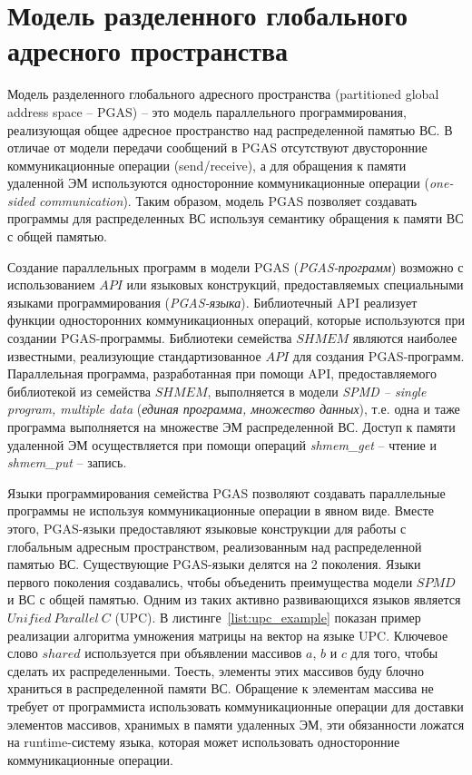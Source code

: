 \chapter{Модель разделенного глобального адресного пространства} \label{chapt4}

Модель разделенного глобального адресного пространства (partitioned global address space -- PGAS) -- это модель параллельного программирования, реализующая общее адресное пространство над распределенной памятью ВС. В отличае от модели передачи сообщений в PGAS отсутствуют двусторонние коммуникационные операции (send/receive), а для обращения к памяти удаленной ЭМ используются односторонние коммуникационные операции (\textit{one-sided communication}). Таким образом, модель PGAS позволяет создавать программы для распределенных ВС используя семантику обращения к памяти ВС с общей памятью.

Создание параллельных программ в модели PGAS (\textit{PGAS-программ}) возможно с использованием $API$ или языковых конструкций, предоставляемых специальными языками программирования (\textit{PGAS-языка}). Библиотечный API реализует функции односторонних коммуникационных операций, которые используются при создании PGAS-программы. Библиотеки семейства $SHMEM$ являются наиболее известными, реализующие стандартизованное $API$ для создания PGAS-программ. Параллельная программа, разработанная при помощи API, предоставляемого библиотекой из семейства $SHMEM$, выполняется в модели \textit{SPMD -- single program, multiple data} (\textit{единая программа, множество данных}), т.е. одна и таже программа выполняется на множестве ЭМ распределенной ВС. Доступ к памяти удаленной ЭМ осуществляется при помощи операций \textit{shmem\_get} -- чтение и \textit{shmem\_put} -- запись.

Языки программирования семейства PGAS позволяют создавать параллельные программы не используя коммуникационные операции в явном виде. Вместе этого, PGAS-языки предоставляют языковые конструкции для работы с глобальным адресным пространством, реализованным над распределенной памятью ВС. Существующие PGAS-языки делятся на 2 поколения. Языки первого поколения создавались, чтобы объеденить преимущества модели $SPMD$ и ВС с общей памятью. Одним из таких активно развивающихся языков является $Unified\ Parallel\ C$ (UPC). В листинге~\ref{list:upc_example} показан пример реализации алгоритма умножения матрицы на вектор на языке UPC. Ключевое слово $shared$ используется при объявлении массивов $a$, $b$ и $c$ для того, чтобы сделать их распределенными. Тоесть, элементы этих массивов буду блочно храниться в распределенной памяти ВС. Обращение к элементам массива не требует от программиста использовать коммуникационные операции для доставки элементов массивов, хранимых в памяти удаленных ЭМ, эти обязанности ложатся на runtime-систему языка, которая может использовать односторонние коммуникационные операции.

